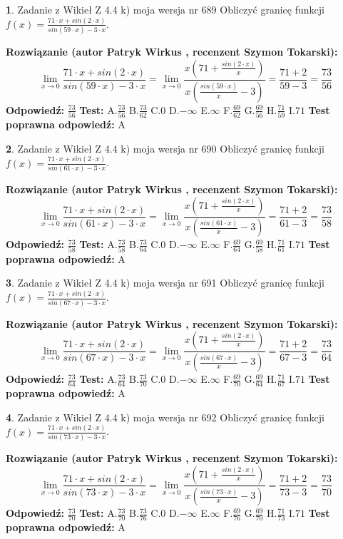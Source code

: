 \documentclass[12pt, a4paper]{article}
\theoremstyle{definition} %
\newtheorem{zad}{}
\newcommand{\zadStart}[1]{\begin{zad}#1\newline}
\newcommand{\zadStop}{\end{zad}}
\newcommand{\rozwStart}[2]{\noindent \textbf{Rozwiązanie (autor #1 , recenzent #2): }\newline}
\newcommand{\rozwStop}{\newline}
\newcommand{\odpStart}{\noindent \textbf{Odpowiedź:}\newline}
\newcommand{\odpStop}{\newline}
\newcommand{\testStart}{\noindent \textbf{Test:}\newline}
\newcommand{\testStop}{\newline}
\newcommand{\kluczStart}{\noindent \textbf{Test poprawna odpowiedź:}\newline}
\newcommand{\kluczStop}{\newline}
\begin{document}
\zadStart{Zadanie z Wikieł Z 4.4 k) moja wersja nr 689}
Obliczyć granicę funkcji $f(x)=\frac{71\cdot x +sin(2\cdot x)}{sin(59\cdot x) -3\cdot x}$.
\zadStop
\rozwStart{Patryk Wirkus}{Szymon Tokarski}
$$\lim\limits_{x\to 0}\frac{71\cdot x +sin(2\cdot x)}{sin(59\cdot x) -3\cdot x}
=\lim\limits_{x\to 0}\frac{x(71+\frac{sin(2\cdot x)}{x})}{x(\frac{sin(59\cdot x)}{x}-3)}
=\frac{71+2}{59-3} = \frac{73}{56}$$
\rozwStop
\odpStart
$\frac{73}{56}$
\odpStop
\testStart
A.$\frac{73}{56}$
B.$\frac{73}{62}$
C.$0$
D.$-\infty$
E.$\infty$
F.$\frac{69}{62}$
G.$\frac{69}{56}$
H.$\frac{71}{59}$
I.$71$
\testStop
\kluczStart
A
\kluczStop



\zadStart{Zadanie z Wikieł Z 4.4 k) moja wersja nr 690}
Obliczyć granicę funkcji $f(x)=\frac{71\cdot x +sin(2\cdot x)}{sin(61\cdot x) -3\cdot x}$.
\zadStop
\rozwStart{Patryk Wirkus}{Szymon Tokarski}
$$\lim\limits_{x\to 0}\frac{71\cdot x +sin(2\cdot x)}{sin(61\cdot x) -3\cdot x}
=\lim\limits_{x\to 0}\frac{x(71+\frac{sin(2\cdot x)}{x})}{x(\frac{sin(61\cdot x)}{x}-3)}
=\frac{71+2}{61-3} = \frac{73}{58}$$
\rozwStop
\odpStart
$\frac{73}{58}$
\odpStop
\testStart
A.$\frac{73}{58}$
B.$\frac{73}{64}$
C.$0$
D.$-\infty$
E.$\infty$
F.$\frac{69}{64}$
G.$\frac{69}{58}$
H.$\frac{71}{61}$
I.$71$
\testStop
\kluczStart
A
\kluczStop



\zadStart{Zadanie z Wikieł Z 4.4 k) moja wersja nr 691}
Obliczyć granicę funkcji $f(x)=\frac{71\cdot x +sin(2\cdot x)}{sin(67\cdot x) -3\cdot x}$.
\zadStop
\rozwStart{Patryk Wirkus}{Szymon Tokarski}
$$\lim\limits_{x\to 0}\frac{71\cdot x +sin(2\cdot x)}{sin(67\cdot x) -3\cdot x}
=\lim\limits_{x\to 0}\frac{x(71+\frac{sin(2\cdot x)}{x})}{x(\frac{sin(67\cdot x)}{x}-3)}
=\frac{71+2}{67-3} = \frac{73}{64}$$
\rozwStop
\odpStart
$\frac{73}{64}$
\odpStop
\testStart
A.$\frac{73}{64}$
B.$\frac{73}{70}$
C.$0$
D.$-\infty$
E.$\infty$
F.$\frac{69}{70}$
G.$\frac{69}{64}$
H.$\frac{71}{67}$
I.$71$
\testStop
\kluczStart
A
\kluczStop



\zadStart{Zadanie z Wikieł Z 4.4 k) moja wersja nr 692}
Obliczyć granicę funkcji $f(x)=\frac{71\cdot x +sin(2\cdot x)}{sin(73\cdot x) -3\cdot x}$.
\zadStop
\rozwStart{Patryk Wirkus}{Szymon Tokarski}
$$\lim\limits_{x\to 0}\frac{71\cdot x +sin(2\cdot x)}{sin(73\cdot x) -3\cdot x}
=\lim\limits_{x\to 0}\frac{x(71+\frac{sin(2\cdot x)}{x})}{x(\frac{sin(73\cdot x)}{x}-3)}
=\frac{71+2}{73-3} = \frac{73}{70}$$
\rozwStop
\odpStart
$\frac{73}{70}$
\odpStop
\testStart
A.$\frac{73}{70}$
B.$\frac{73}{76}$
C.$0$
D.$-\infty$
E.$\infty$
F.$\frac{69}{76}$
G.$\frac{69}{70}$
H.$\frac{71}{73}$
I.$71$
\testStop
\kluczStart
A
\kluczStop
\end{document}
